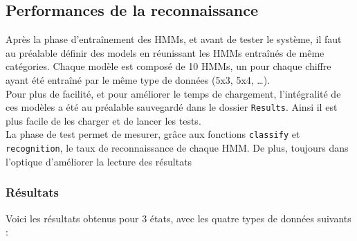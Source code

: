 \subsection{Performances de la reconnaissance}

Après la phase d'entraînement des HMMs, et avant de tester le système, il faut au préalable définir des models en réunissant les HMMs entraînés de même catégories. Chaque modèle est composé de 10 HMMs, un pour chaque chiffre ayant été entraîné par le même type de données (5x3, 5x4, \dots).\\

Pour plus de facilité, et pour améliorer le temps de chargement, l'intégralité de ces modèles a été au préalable sauvegardé dans le dossier \texttt{Results}. Ainsi il est plus facile de les charger et de lancer les tests.\\

La phase de test permet de mesurer, grâce aux fonctions \texttt{classify} et \texttt{recognition}, le taux de reconnaissance de chaque HMM. De plus, toujours dans l'optique d'améliorer la lecture des résultats

\subsubsection*{Résultats}
Voici les résultats obtenus pour 3 états, avec les quatre types de données suivants :
\newpage

